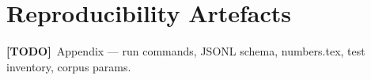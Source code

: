 \documentclass[11pt,a4paper]{report}
\newcommand{\todo}[1]{\par\noindent\textcolor{red!70!black}{\small\textbf{[TODO]}~#1}\par}
\begin{document}



\appendix
\chapter{Reproducibility Artefacts}
\todo{Appendix — run commands, JSONL schema, numbers.tex, test inventory, corpus params.}
\end{document}
